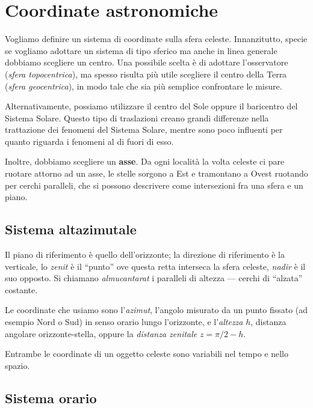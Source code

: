 \documentclass[main.tex]{subfiles}
\begin{document}
\section{Coordinate astronomiche}


Vogliamo definire un sistema di coordinate sulla sfera celeste. Innanzitutto, specie se vogliamo adottare un sistema di tipo sferico ma anche in linea generale dobbiamo scegliere un centro.
Una possibile scelta è di adottare l'osservatore (\emph{sfera topocentrica}), ma spesso risulta più utile scegliere il centro della Terra (\emph{sfera geocentrica}), in modo tale che sia più semplice confrontare le misure.

Alternativamente, possiamo utilizzare il centro del Sole oppure il baricentro del Sistema Solare. 
Questo tipo di traslazioni creano grandi differenze nella trattazione dei fenomeni del Sistema Solare, mentre sono poco influenti per quanto riguarda i fenomeni al di fuori di esso. 

Inoltre, dobbiamo scegliere un \textbf{asse}. Da ogni località la volta celeste ci pare ruotare attorno ad un asse, le stelle sorgono a Est e tramontano a Ovest ruotando per cerchi paralleli, che si possono descrivere come intersezioni fra una sfera e un piano. 

\subsection{Sistema altazimutale}

Il piano di riferimento è quello dell'orizzonte; la direzione di riferimento è la verticale, lo \emph{zenit} è il ``punto'' ove questa retta interseca la sfera celeste, \emph{nadir} è il suo opposto.
Si chiamano \emph{almucantarat} i paralleli di altezza --- cerchi di ``alzata'' costante. 

Le coordinate che usiamo sono l'\emph{azimut}, l'angolo misurato da un punto fissato (ad esempio Nord o Sud) in senso orario lungo l'orizzonte, e l'\emph{altezza} \(h\), distanza angolare orizzonte-stella, oppure la \emph{distanza zenitale} \(z = \pi/2 - h\).

Entrambe le coordinate di un oggetto celeste sono variabili nel tempo e nello spazio. 

\subsection{Sistema orario}
\end{document}

